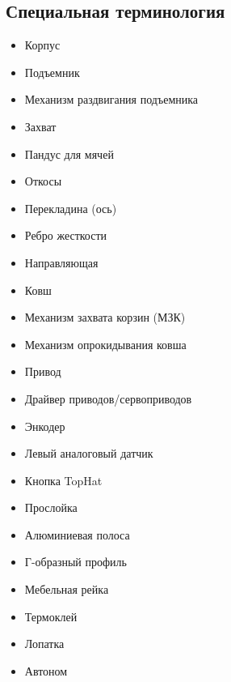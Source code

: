 \subsection{Специальная терминология}

\begin{itemize}
	\item Корпус
	\item Подъемник
	\item Механизм раздвигания подъемника
	\item Захват
	\item Пандус для мячей
	\item Откосы
	\item Перекладина (ось)
	\item Ребро жесткости
	\item Направляющая
	\item Ковш
	\item Механизм захвата корзин (МЗК)
	\item Механизм опрокидывания ковша
	\item Привод
	\item Драйвер приводов/сервоприводов
	\item Энкодер
	\item Левый аналоговый датчик
	\item Кнопка TopHat
	\item Прослойка
	\item Алюминиевая полоса
	\item Г-образный профиль
	\item Мебельная рейка
	\item Термоклей
	\item Лопатка
	\item Автоном
\end{itemize}

\fillpage 
\newpage
